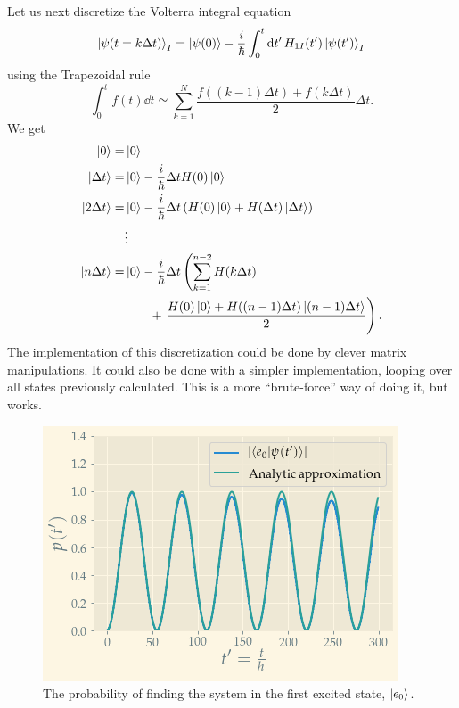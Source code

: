 Let us next discretize the Volterra integral equation
\begin{equation} 
\ket{\psi(t=k\Delta t)}_I = \ket{\psi(0)} -\frac{i}{\hbar}\int_0^t\dd{t'}H_{1I}(t')\ket{\psi(t')}_I
\end{equation}
using the Trapezoidal rule
\begin{equation} 
\int_0^tf(t)\dd{t} \simeq \sum_{k=1}^{N}\frac{f((k-1)\Delta t)+f(k\Delta t)}{2}\Delta t.
\end{equation}
We get
\begin{align*} 
\ket{0} = &\ket{0} \\
\ket{\Delta t} = &\ket{0} - \frac{i}{\hbar}\Delta t H(0)\ket{0} \\
\ket{2\Delta t} = &\ket{0} - \frac{i}{\hbar}\Delta t \left(H(0)\ket{0} + H(\Delta t)\ket{\Delta t}\right) \\
&\vdots \\
\ket{n\Delta t} = &\ket{0}-\frac{i}{\hbar}\Delta t\left(\sum_{k=1}^{n-2}H(k\Delta t)\right. \\ 
&\qquad+ \left.\frac{H(0)\ket{0} + H((n-1)\Delta t)\ket{(n-1)\Delta t}}{2}\vphantom{(\sum_{k=1}^{n-2}}\right).
\end{align*}
The implementation of this discretization could be done by clever matrix manipulations. It could also be done with a simpler implementation, looping over all states previously calculated. This is a more ``brute-force'' way of doing it, but works.
\begin{figure}
	\centering
	\includegraphics[width=\linewidth]{img/transition_prob.png}
	\caption{The probability of finding the system in the first excited state, $\ket{e_0}$.}
	\label{fig:trans}
\end{figure}
